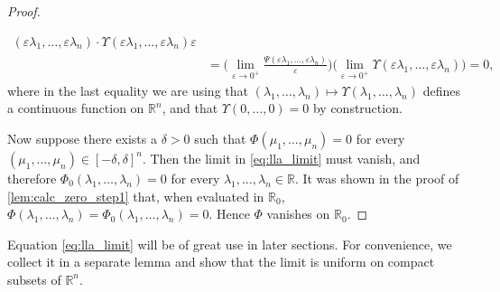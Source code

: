 \documentclass{memo-l}
\theoremstyle{definition}
\theoremstyle{remark}
\numberwithin{section}{chapter}
\numberwithin{equation}{chapter}
\newcommand\R{\ensuremath{\mathbb{R}}}
\begin{document}
\begin{proof}
\begin{enumerate}
\begin{align*}
{            (\varepsilon \lambda _1,\ldots ,\varepsilon \lambda
        _n)\cdot \Upsilon (\varepsilon \lambda _1,\ldots ,\varepsilon \lambda
    _n)}{\varepsilon }\\&=\bigg(\lim_{\varepsilon  \to 0^{+}} \frac{ \Psi
            (\varepsilon \lambda _1,\ldots ,\varepsilon \lambda
    _n)}{\varepsilon }\bigg) \bigg(\lim_{\varepsilon  \to 0^{+}} \Upsilon
            (\varepsilon \lambda _1,\ldots ,\varepsilon \lambda
        _n)\bigg)=0,
            \end{align*}
        where in the last equality we are using that $(\lambda _1,\ldots
        ,\lambda _n)\mapsto \Upsilon(\lambda _1,\ldots ,\lambda _n)$ defines a continuous
        function on $\R^{n}$, and that $\Upsilon(0,\ldots ,0)=0$ by
        construction.
    \end{enumerate}

    Now suppose there exists a $\delta >0$ such that $\Phi (\mu
    _1,\ldots ,\mu  _n)=0$ for every $(\mu  _1,\ldots ,\mu  _n)
    \in [-\delta ,\delta ]^{n}$. Then the limit in \eqref{eq:lla_limit} must vanish, and
    therefore $\Phi _0 (\lambda  _1,\ldots ,\lambda  _n)=0$ for
    every
    $\lambda _1,\ldots ,\lambda _n \in \R$. It was shown in
    the proof of \cref{lem:calc_zero_step1} that, when evaluated in $\R_0$,
    $\Phi (\lambda _1,\ldots , \lambda _n)=\Phi _0(\lambda
    _1,\ldots ,\lambda _n)=0$. Hence $\Phi $ vanishes on $\R_0$.
\end{proof}

Equation \eqref{eq:lla_limit} will be of great use in later sections.
For convenience, we collect it in a separate lemma and show that the
limit is uniform on compact subsets of $\R^{n}$.
\end{document}
